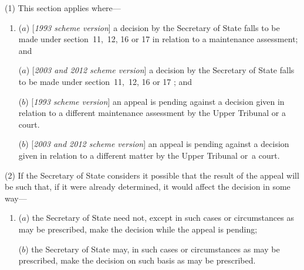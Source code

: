 \documentclass[12pt,a4paper]{article}
\begin{document}
(1) This section applies where—
\begin{enumerate}\item[]
($a$) [\emph{1993 scheme version}] a decision by the 
Secretary of State  %
falls to be made under section~11,~12, 16 or 17 in relation to a maintenance assessment; and

($a$) [\emph{2003 and 2012 scheme version}] a decision by the 
Secretary of State  %
falls to be made under section~11,~12, 16 or 17%
; and

($b$) [\emph{1993 scheme version}] an appeal is pending against a decision given in relation to a different maintenance assessment by 
the Upper Tribunal  %
or a court.

($b$) [\emph{2003 and 2012 scheme version}] an appeal is pending against a decision given in relation to a different matter by 
the Upper Tribunal  %
or~a court.
\end{enumerate}

(2) If the 
Secretary of State  %
considers it possible that the result of the appeal will be such that, if it were already determined, it would affect the decision in some way—
\begin{enumerate}\item[]
($a$) 
the Secretary of State  %
need not, except in such cases or circumstances as may be prescribed, make the decision while the appeal is pending;

($b$) 
the Secretary of State  %
may, in such cases or circumstances as may be prescribed, make the decision on such basis as may be prescribed.
\end{enumerate}
\end{document}
